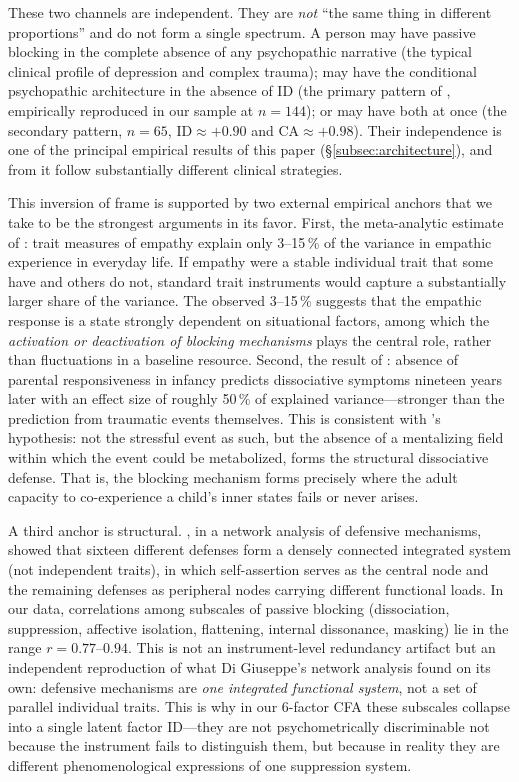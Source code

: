 These two channels are independent. They are \emph{not} ``the same thing in different proportions'' and do not form a single spectrum. A person may have passive blocking in the complete absence of any psychopathic narrative (the typical clinical profile of depression and complex trauma); may have the conditional psychopathic architecture in the absence of ID (the primary pattern of \citet{karpman1941}, empirically reproduced in our sample at $n = 144$); or may have both at once (the secondary pattern, $n = 65$, $\mathrm{ID} \approx +0.90$ and $\mathrm{CA} \approx +0.98$). Their independence is one of the principal empirical results of this paper (§\ref{subsec:architecture}), and from it follow substantially different clinical strategies.

This inversion of frame is supported by two external empirical anchors that we take to be the strongest arguments in its favor. First, the meta-analytic estimate of \citet{depow2025}: trait measures of empathy explain only 3--15\,\% of the variance in empathic experience in everyday life. If empathy were a stable individual trait that some have and others do not, standard trait instruments would capture a substantially larger share of the variance. The observed 3--15\,\% suggests that the empathic response is a state strongly dependent on situational factors, among which the \emph{activation or deactivation of blocking mechanisms} plays the central role, rather than fluctuations in a baseline resource. Second, the result of \citet{ogawa1997}: absence of parental responsiveness in infancy predicts dissociative symptoms nineteen years later with an effect size of roughly 50\,\% of explained variance---stronger than the prediction from traumatic events themselves. This is consistent with \citet{fonagy2002}'s hypothesis: not the stressful event as such, but the absence of a mentalizing field within which the event could be metabolized, forms the structural dissociative defense. That is, the blocking mechanism forms precisely where the adult capacity to co-experience a child's inner states fails or never arises.

A third anchor is structural. \citet{digiuseppe2024}, in a network analysis of defensive mechanisms, showed that sixteen different defenses form a densely connected integrated system (not independent traits), in which self-assertion serves as the central node and the remaining defenses as peripheral nodes carrying different functional loads. In our data, correlations among subscales of passive blocking (dissociation, suppression, affective isolation, flattening, internal dissonance, masking) lie in the range $r = 0.77$--$0.94$. This is not an instrument-level redundancy artifact but an independent reproduction of what Di Giuseppe's network analysis found on its own: defensive mechanisms are \emph{one integrated functional system}, not a set of parallel individual traits. This is why in our 6-factor CFA these subscales collapse into a single latent factor ID---they are not psychometrically discriminable not because the instrument fails to distinguish them, but because in reality they are different phenomenological expressions of one suppression system.

